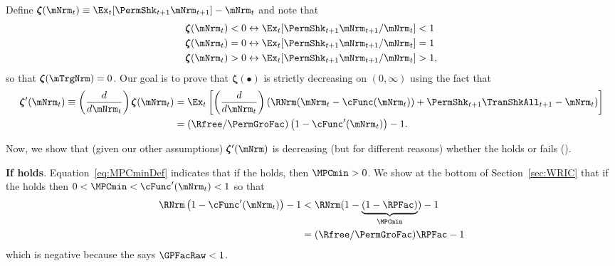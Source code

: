 \documentclass[\econtexRoot/BufferStockTheory]{subfiles}
\begin{document}
Define \providecommand{\difFunc}{\pmb{\zeta}} $\difFunc(\mNrm_t) \equiv 
\Ex_t[\PermShk_{t+1}\mNrm_{t+1}] - \mNrm_t$ and note that
\begin{align}\label{eq:difLvlEquiv}
  \difFunc(\mNrm_t) < 0 &\leftrightarrow \Ex_t[\PermShk_{t+1}\mNrm_{t+1}/\mNrm_{t}] < 1 
                          \nonumber\\
  \difFunc(\mNrm_t) = 0 &\leftrightarrow \Ex_t[\PermShk_{t+1}\mNrm_{t+1}/\mNrm_{t}] = 1\\
  \difFunc(\mNrm_t) > 0 &\leftrightarrow \Ex_t[\PermShk_{t+1}\mNrm_{t+1}/\mNrm_{t}] > 
                          1,\nonumber
\end{align}
so that $\difFunc(\mTrgNrm)=0$. Our goal is to prove that $\difFunc(\bullet)$ is strictly 
decreasing on $(0,\infty)$ using the fact that
\begin{align}
  \difFunc^{\prime}(\mNrm_{t}) \equiv  \left( \frac{d}{d\mNrm_{t}}\right) \difFunc(\mNrm_t)  & = \Ex_{t}\left[
                                                                                               \left( \frac{d}{d\mNrm_{t}}\right) \left( 
                                                                                               {\RNrm}(\mNrm_{t}-\cFunc(\mNrm_{t}))+%
                                                                                               {\PermShk}_{t+1}{\TranShkAll}_{t+1} - {\mNrm}_t\right) \right] \label{eq:difFuncDecreases} \\
                                                                                             & = (\Rfree/\PermGroFac)\left(1-\cFunc^{\prime}({\mNrm}_t)\right) - 1.  \notag
\end{align}

Now, we show that (given our other assumptions) $\difFunc^{\prime}(\mNrm)$ is decreasing (but for different reasons) whether the {\RIC} holds or fails (\cncl{\RIC}).

\textbf{If {\RIC} holds}. Equation~\eqref{eq:MPCminDef} indicates that if the {\RIC} holds, then $\MPCmin >0$.  We show at the bottom of Section~\ref{sec:WRIC} that if the {\RIC} holds then $0 < \MPCmin < \cFunc^{\prime}(\mNrm_{t}) < 1$ so that 
\begin{align*}
  \RNrm\left(1-\cFunc^{\prime}({\mNrm}_t)\right) - 1 & <  \RNrm(1-\underbrace{(1-\RPFac)}_{\MPCmin}) - 1  \\
                                                      & = (\Rfree/\PermGroFac)\RPFac - 1 
\end{align*}
which is negative because the {\GICRaw} says $\GPFacRaw < 1$.  
\end{document}
